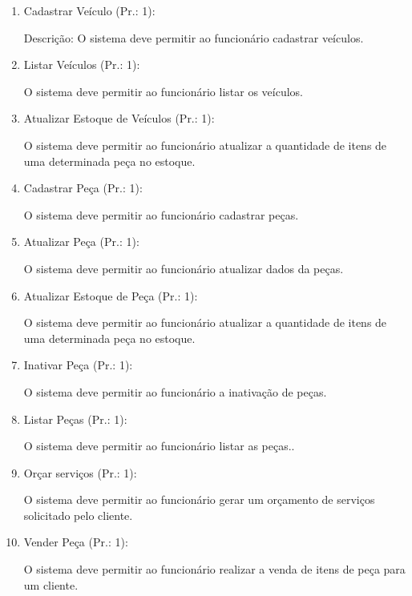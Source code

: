 \begin{enumerate}[
	label=RF\arabic{*}, 
	ref=(RF\arabic{*}),
	leftmargin=1.5em,
	itemindent=4.5em]
\item Cadastrar Veículo (Pr.: 1):\par
Descrição: O sistema deve permitir ao funcionário cadastrar veículos.\par

\item Listar Veículos (Pr.: 1):\par
O sistema deve permitir ao funcionário listar os veículos.\par

\item Atualizar Estoque de Veículos (Pr.: 1):\par
O sistema deve permitir ao funcionário atualizar a quantidade de itens de uma determinada peça no estoque.\par

\item Cadastrar Peça (Pr.: 1):\par
O sistema deve permitir ao funcionário cadastrar  peças.\par

\item Atualizar Peça (Pr.: 1):\par
O sistema deve permitir ao funcionário atualizar dados da peças.\par

\item  Atualizar Estoque de Peça (Pr.: 1):\par
O sistema deve permitir ao funcionário atualizar a quantidade de itens de uma determinada peça no estoque.\par

\item  Inativar Peça (Pr.: 1):\par
O sistema deve permitir ao funcionário a inativação de peças.\par

\item  Listar Peças (Pr.: 1):\par
O sistema deve permitir ao funcionário listar as peças..\par

\item Orçar serviços (Pr.: 1):\par
O sistema deve permitir ao funcionário gerar um orçamento de serviços solicitado  pelo cliente.\par

\item Vender Peça (Pr.: 1):\par
O sistema deve permitir ao funcionário realizar a venda de  itens de peça para um cliente.\par


\end{enumerate}
